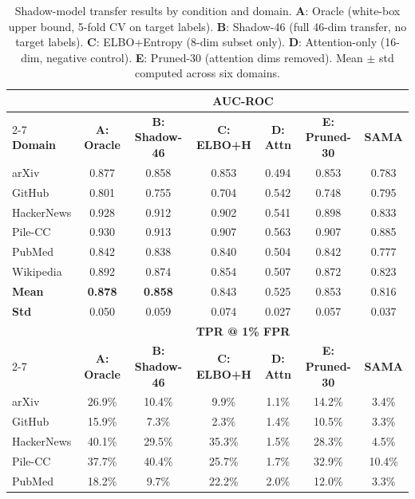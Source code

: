 \begin{table}[t]
\centering
\caption{Shadow-model transfer results by condition and domain.
         \textbf{A}: Oracle (white-box upper bound, 5-fold CV on target labels).
         \textbf{B}: Shadow-46 (full 46-dim transfer, no target labels).
         \textbf{C}: ELBO+Entropy (8-dim subset only).
         \textbf{D}: Attention-only (16-dim, negative control).
         \textbf{E}: Pruned-30 (attention dims removed).
         Mean $\pm$ std computed across six domains.}
\label{tab:shadow}
\small
\setlength{\tabcolsep}{4pt}
\begin{tabular}{l ccccc c}
\toprule
& \multicolumn{6}{c}{\textbf{AUC-ROC}} \\
\cmidrule(lr){2-7}
\textbf{Domain} & \textbf{A: Oracle} & \textbf{B: Shadow-46} & \textbf{C: ELBO+H} & \textbf{D: Attn} & \textbf{E: Pruned-30} & \textbf{SAMA} \\
\midrule
arXiv         & 0.877 & 0.858 & 0.853 & 0.494 & 0.853 & 0.783 \\
GitHub        & 0.801 & 0.755 & 0.704 & 0.542 & 0.748 & 0.795 \\
HackerNews    & 0.928 & 0.912 & 0.902 & 0.541 & 0.898 & 0.833 \\
Pile-CC       & 0.930 & 0.913 & 0.907 & 0.563 & 0.907 & 0.885 \\
PubMed        & 0.842 & 0.838 & 0.840 & 0.504 & 0.842 & 0.777 \\
Wikipedia     & 0.892 & 0.874 & 0.854 & 0.507 & 0.872 & 0.823 \\
\midrule
\textbf{Mean} & \textbf{0.878} & \textbf{0.858} & 0.843 & 0.525 & 0.853 & 0.816 \\
\textbf{Std}  & 0.050 & 0.059 & 0.074 & 0.027 & 0.057 & 0.037 \\
\midrule
& \multicolumn{6}{c}{\textbf{TPR @ 1\% FPR}} \\
\cmidrule(lr){2-7}
& \textbf{A: Oracle} & \textbf{B: Shadow-46} & \textbf{C: ELBO+H} & \textbf{D: Attn} & \textbf{E: Pruned-30} & \textbf{SAMA} \\
\midrule
arXiv         & 26.9\% &  10.4\% &  9.9\% & 1.1\% & 14.2\% &  3.4\% \\
GitHub        & 15.9\% &   7.3\% &  2.3\% & 1.4\% & 10.5\% &  3.3\% \\
HackerNews    & 40.1\% &  29.5\% & 35.3\% & 1.5\% & 28.3\% &  4.5\% \\
Pile-CC       & 37.7\% &  40.4\% & 25.7\% & 1.7\% & 32.9\% & 10.4\% \\
PubMed        & 18.2\% &   9.7\% & 22.2\% & 2.0\% & 12.0\% &  3.3\% \\

\end{tabular}
\end{table}
